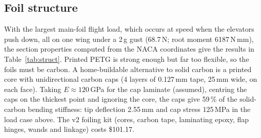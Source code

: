 \documentclass[10pt,twocolumn]{article}
\begin{document}
\subsection{Foil structure}
With the largest main-foil flight load, which occurs at speed when the elevators push down, all on one wing under a 2\,g gust (68.7\,N; root moment 6187\,N\,mm), the section properties computed from the NACA coordinates give the results in Table~\ref{tab:struct}. Printed PETG is strong enough but far too flexible, so the foils must be carbon. A home-buildable alternative to solid carbon is a printed core with unidirectional carbon caps (4 layers of 0.127\,mm tape, 25\,mm wide, on each face). Taking $E\approx120$\,GPa for the cap laminate (assumed), centring the caps on the thickest point and ignoring the core, the caps give 59\,\% of the solid-carbon bending stiffness: tip deflection 2.55\,mm and cap stress 125\,MPa in the load case above. The v2 foiling kit (cores, carbon tape, laminating epoxy, flap hinges, wands and linkage) costs \$101.17.
\begin{table}[t]
\centering\small
\caption{L-foil structural check (v2.3 foils).}
\label{tab:struct}
\end{table}
\end{document}
